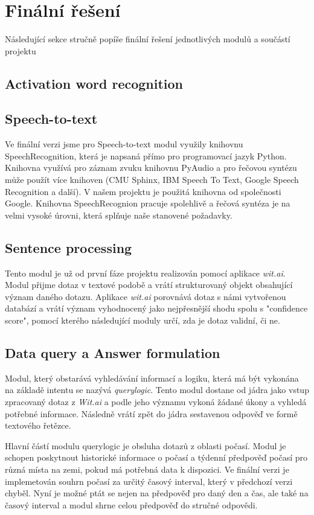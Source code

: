 \documentclass[12pt,a4paper]{article}
\begin{document}
\section{Finální řešení}
Následující sekce stručně popíše finální řešení jednotlivých modulů a součástí projektu


\subsection{Activation word recognition}

\subsection{Speech-to-text}
Ve finální verzi jsme pro Speech-to-text modul využily knihovnu SpeechRecognition, která je napsaná přímo pro programovací jazyk Python. Knihovna využívá pro záznam zvuku knihovnu PyAudio a pro řečovou syntézu může použít více knihoven (CMU Sphinx, IBM Speech To Text, Google Speech Recognition a další). V našem projektu je použitá knihovna od společnosti Google. Knihovna SpeechRecognion pracuje spolehlivě a řečová syntéza je na velmi vysoké úrovni, která splňuje naše stanovené požadavky.

\subsection{Sentence processing}
Tento modul je už od první fáze projektu realizován pomocí aplikace \textit{wit.ai}. Modul přijme dotaz v textové podobě a vrátí strukturovaný objekt obsahující význam daného dotazu. Aplikace \textit{wit.ai} porovnává dotaz s námi vytvořenou databází a vrátí význam vyhodnocený jako nejpřesnější shodu spolu s "confidence score", pomocí kterého následující moduly určí, zda je dotaz validní, či ne.

\subsection{Data query a Answer formulation}
Modul, který obstarává vyhledávání informací a logiku, která má být vykonána na základě intentu se nazývá \textit{querylogic}. Tento modul dostane od jádra jako vstup zpracovaný dotaz z \textit{Wit.ai} a podle jeho významu vykoná žádané úkony a vyhledá potřebné informace. Následně vrátí zpět do jádra sestavenou odpověď ve formě textového řetězce.

Hlavní částí modulu querylogic je obsluha dotazů z oblasti počasí.  Modul je schopen poskytnout historické informace o počasí a týdenní předpověď počasí pro různá místa na zemi, pokud má potřebná data k dispozici. Ve finální verzi je implemetován souhrn počasí za určitý časový interval, který v předchozí verzi chyběl. Nyní je možné ptát se nejen na předpověď pro daný den a čas, ale také na časový interval a modul shrne celou předpověď do stručné odpovědi.
\end{document}
